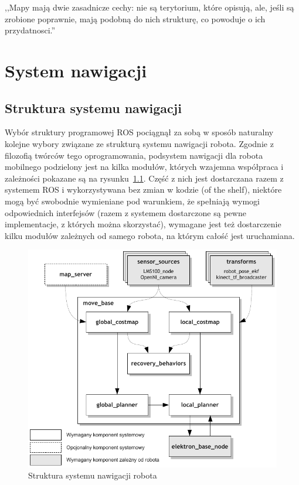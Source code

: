 

\begin{savequote}[70mm]
,,Mapy mają dwie zasadnicze cechy: nie są terytorium, które opisują, ale, jeśli
są zrobione poprawnie, mają podobną do nich strukturę, co powoduje o ich
przydatnosci.''
\end{savequote}


\chapter{System nawigacji}
\label{chap:mapa}

\section{Struktura systemu nawigacji}

Wybór struktury programowej ROS pociągnął za sobą w sposób naturalny kolejne
wybory związane ze strukturą systemu nawigacji robota. Zgodnie z filozofią
twórców tego oprogramowania, podsystem nawigacji dla robota mobilnego podzielony
jest na kilka modułów, których wzajemna współpraca i zależności pokazane są na
rysunku~\ref{fig:diag_move_base}. Część z nich jest dostarczana razem z systemem
ROS i wykorzystywana bez zmian w kodzie (of the shelf), niektóre mogą być
swobodnie wymieniane pod warunkiem, że spełniają wymogi odpowiednich interfejsów
(razem z systemem dostarczone są pewne implementacje, z których można
skorzystać), wymagane jest też dostarczenie kilku modułów zależnych od samego
robota, na którym całość jest uruchamiana.

\begin{figure}[h!]
\centering
\includegraphics{../img/diag_move_base}
\caption{Struktura systemu nawigacji robota}
\label{fig:diag_move_base}
\end{figure}

